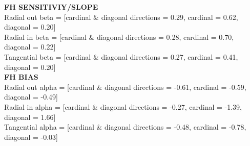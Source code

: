 \documentclass[11pt]{article} %
\begin{document}
\textbf{FH SENSITIVIY/SLOPE}
\\
Radial out beta = [cardinal \& diagonal directions =  0.29, cardinal = 0.62, diagonal = 0.20]
\\
Radial in beta = [cardinal \& diagonal directions =  0.28, cardinal = 0.70, diagonal = 0.22]
\\
Tangential beta = [cardinal \& diagonal directions =  0.27, cardinal = 0.41, diagonal = 0.20]
\\
\textbf{FH BIAS}
\\
Radial out alpha = [cardinal \& diagonal directions =  -0.61, cardinal = -0.59, diagonal = -0.49]
\\
Radial in alpha = [cardinal \& diagonal directions =  -0.27, cardinal = -1.39, diagonal = 1.66]
\\
Tangential alpha = [cardinal \& diagonal directions =  -0.48, cardinal = -0.78, diagonal = -0.03]

\newpage
\end{document}
